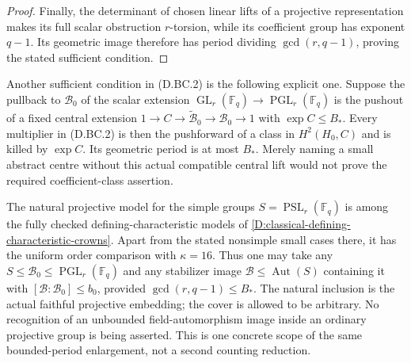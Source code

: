 \begin{proof}
Finally, the determinant of chosen linear lifts of
a projective representation makes its full scalar
obstruction $r$-torsion, while its coefficient group
has exponent $q-1$. Its geometric image therefore
has period dividing $\gcd(r,q-1)$, proving the stated
sufficient condition.
\end{proof}

\begin{remark}
Another sufficient condition in (D.BC.2) is the following
explicit one. Suppose the pullback to $\mathcal B_0$ of
the scalar extension
$\operatorname{GL}_r(\mathbb F_q)\to
\operatorname{PGL}_r(\mathbb F_q)$ is the pushout of
a fixed central extension
$1\to C\to\widetilde{\mathcal B}_0\to\mathcal B_0\to1$
with $\exp C\le B_*$.
Every multiplier in (D.BC.2) is then the pushforward
of a class in $H^2(H_0,C)$ and is killed by $\exp C$.
Its geometric period is at most $B_*$.
Merely naming a small abstract centre without this
actual compatible central lift would not prove the
required coefficient-class assertion.
\end{remark}

\begin{remark}
The natural projective model for the simple groups
$S=\operatorname{PSL}_r(\mathbb F_q)$ is among the
fully checked defining-characteristic models of
\ref{D:classical-defining-characteristic-crowns}.
Apart from the stated nonsimple small cases there,
it has the uniform order comparison with $\kappa=16$.
Thus one may take any
$S\le\mathcal B_0\le\operatorname{PGL}_r(\mathbb F_q)$
and any stabilizer image $\mathcal B\le\operatorname{Aut}(S)$
containing it with $[\mathcal B:\mathcal B_0]\le b_0$,
provided $\gcd(r,q-1)\le B_*$.
The natural inclusion is the actual faithful projective
embedding; the cover is allowed to be arbitrary.
No recognition of an unbounded field-automorphism image
inside an ordinary projective group is being asserted.
This is one concrete scope of the same bounded-period
enlargement, not a second counting reduction.
\end{remark}
